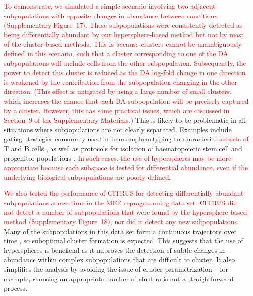 \documentclass{article}
\newcommand\revised[1]{\textcolor{red}{#1}}
\newcommand{\suppoverclust}{9}
\newcommand{\suppfigclustersim}{17}
\newcommand{\suppfigclusterreal}{18}
\begin{document}
\revised{To demonstrate, we simulated a simple scenario involving two adjacent subpopulations with opposite changes in abundance between conditions (Supplementary Figure~\suppfigclustersim{}).
These subpopulations were consistently detected as being differentially abundant by our hypersphere-based method but not by most of the cluster-based methods.
This is because clusters cannot be unambiguously defined in this scenario, such that a cluster corresponding to one of the DA subpopulations will include cells from the other subpopulation.
Subsequently, the power to detect this cluster is reduced as the DA log-fold change in one direction is weakened by the contribution from the subpopulation changing in the other direction.
(This effect is mitigated by using a large number of small clusters, which increases the chance that each DA subpopulation will be precisely captured by a cluster.
However, this has some practical issues, which are discussed in Section~\suppoverclust{} of the Supplementary Materials.)}
This is likely to be problematic in all situations where subpopulations are not clearly separated.
Examples include gating strategies commonly used in immunophenotyping to characterise \revised{subsets of} T and B cells \cite{finak2016standardizing}, as well as protocols for isolation of haematopoietic stem cell and progenitor populations \cite{wilson2015combined}.
\revised{In such cases, the use of hyperspheres may be more appropriate because each subspace is tested for differential abundance, even if the underlying biological subpopulations are poorly defined.}

\revised{We also tested the performance of CITRUS for detecting differentially abundant subpopulations across time in the MEF reprogramming data set.
CITRUS did not detect a number of subpopulations that were found by the hypersphere-based method (Supplementary Figure~\suppfigclusterreal{}), nor did it detect any new subpopulations.}
Many of the subpopulations in this data set form a continuous trajectory over time \cite{zunder2015continuous}, so suboptimal cluster formation is expected.
This suggests that the use of hyperspheres is beneficial as it improves the detection of subtle changes in abundance within complex subpopulations that are difficult to cluster.
It also simplifies the analysis by avoiding the issue of cluster parametrization -- for example, choosing an appropriate number of clusters is not a straightforward process.

\end{document}
